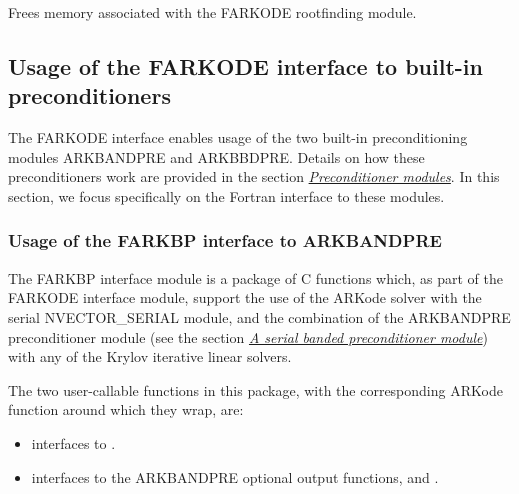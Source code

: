 \documentclass[letterpaper,10pt,english]{sphinxmanual}
\begin{document}
\begin{fulllineitems}
\label{f_interface/Rootfinding:f/_/FARKROOTFREE}
Frees memory associated with the FARKODE rootfinding module.

\end{fulllineitems}



\subsection{Usage of the FARKODE interface to built-in preconditioners}
\label{f_interface/Preconditioning:finterface-preconditioning}\label{f_interface/Preconditioning::doc}\label{f_interface/Preconditioning:usage-of-the-farkode-interface-to-built-in-preconditioners}
The FARKODE interface enables usage of the two built-in
preconditioning modules ARKBANDPRE and ARKBBDPRE.  Details on how
these preconditioners work are provided in the section
{\hyperref[c_interface/Preconditioners:cinterface-preconditionermodules]{\emph{Preconditioner modules}}}.  In this section, we focus
specifically on the Fortran interface to these modules.


\subsubsection{Usage of the FARKBP interface to ARKBANDPRE}
\label{f_interface/Preconditioning:usage-of-the-farkbp-interface-to-arkbandpre}\label{f_interface/Preconditioning:finterface-bandpre}
The FARKBP interface module is a package of C functions which,
as part of the FARKODE interface module, support the use of the
ARKode solver with the serial NVECTOR\_SERIAL module, and the
combination of the ARKBANDPRE preconditioner module (see the
section {\hyperref[c_interface/Preconditioners:cinterface-bandpre]{\emph{A serial banded preconditioner module}}}) with any of the Krylov iterative
linear solvers.

The two user-callable functions in this package, with the
corresponding ARKode function around which they wrap, are:
\begin{itemize}
\item {} 
{\hyperref[f_interface/Preconditioning:f/_/FARKBPINIT]{}} interfaces to {\hyperref[c_interface/Preconditioners:ARKBandPrecInit]{}}.

\item {} 
{\hyperref[f_interface/Preconditioning:f/_/FARKBPOPT]{}} interfaces to the ARKBANDPRE optional output
functions, {\hyperref[c_interface/Preconditioners:ARKBandPrecGetWorkSpace]{}} and
{\hyperref[c_interface/Preconditioners:ARKBandPrecGetNumRhsEvals]{}}.

\end{itemize}
\end{document}
